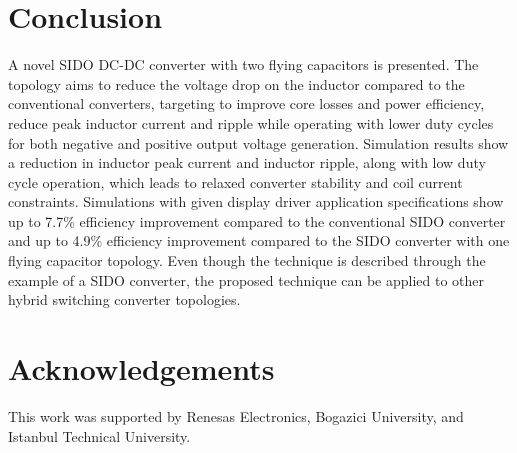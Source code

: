 \documentclass[conference,beamer]{IEEEtran}
\begin{document}
\section{Conclusion}

A novel SIDO DC-DC converter with two flying capacitors is presented. The topology aims to reduce the voltage drop on the inductor compared to the conventional converters, targeting to improve core losses and power efficiency, reduce peak inductor current and ripple while operating with lower duty cycles for both negative and positive output voltage generation. Simulation results show a reduction in inductor peak current and inductor ripple, along with low duty cycle operation, which leads to relaxed converter stability and coil current constraints. Simulations with given display driver application specifications show up to 7.7\% efficiency improvement compared to the conventional SIDO converter and up to 4.9\% efficiency improvement compared to the SIDO converter with one flying capacitor topology. Even though the technique is described through the example of a SIDO converter, the proposed technique can be applied to other hybrid switching converter topologies. 




\section*{Acknowledgements}
This work was supported by Renesas Electronics, Bogazici University, and Istanbul Technical University. 



\end{document}
